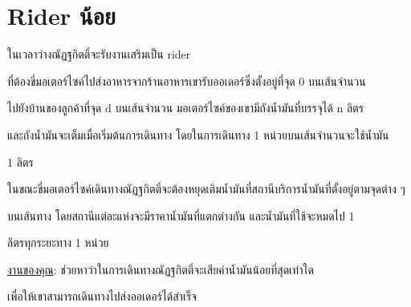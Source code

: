 \documentclass{article}
\begin{document}
\section*{Rider น้อย}

ในเวลาว่างณัฏฐกิตติ์จะรับงานเสริมเป็น rider

ที่ต้องขี่มอเตอร์ไซค์ไปส่งอาหารจากร้านอาหารเขารับออเดอร์ซึ่งตั้งอยู่ที่จุด 0 บนเส้นจำนวน

ไปยังบ้านของลูกค้าที่จุด d บนเส้นจำนวน มอเตอร์ไซค์ของเขามีถังน้ำมันที่บรรจุได้ n ลิตร

และถังน้ำมันจะเต็มเมื่อเริ่มต้นการเดินทาง โดยในการเดินทาง 1 หน่วยบนเส้นจำนวนจะใช้น้ำมัน

1 ลิตร

ในขณะขี่มอเตอร์ไซค์เดินทางณัฏฐกิตติ์จะต้องหยุดเติมน้ำมันที่สถานีบริการน้ำมันที่ตั้งอยู่ตามจุดต่าง ๆ

บนเส้นทาง โดยสถานีแต่ละแห่งจะมีราคาน้ำมันที่แตกต่างกัน และน้ำมันที่ใช้จะหมดไป 1

ลิตรทุกระยะทาง 1 หน่วย



\ul{งานของคุณ}: ช่วยหาว่าในการเดินทางณัฏฐกิตติ์จะเสียค่าน้ำมันน้อยที่สุดเท่าใด

เพื่อให้เขาสามารถเดินทางไปส่งออเดอร์ได้สำเร็จ



\hfill\break
\end{document}
